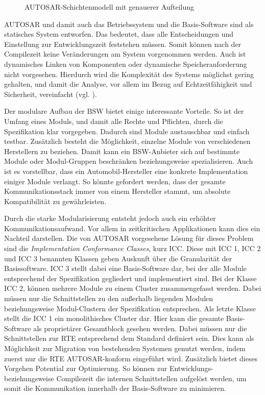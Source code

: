 \documentclass[
  a4paper,					    %
  twoside,
  DIV=calc,     				%
  bibliography=totoc,
  cleardoublepage=empty,
  ngerman,     					%
  final       					%
]{scrbook}
\begin{document}
\begin{figure}[ht]
    \centering
    \resizebox{\linewidth}{!}{}
    \caption{AUTOSAR-Schichtenmodell mit genauerer Aufteilung}
    \label{fig:autosar_refined_layer}
\end{figure}

AUTOSAR und damit auch das Betriebssystem und die Basis-Software sind als statisches System entworfen. Das bedeutet, dass alle Entscheidungen und Einstellung zur Entwicklungszeit feststehen müssen. Somit können nach der Compilezeit keine Veränderungen am System vorgenommen werden. Auch ist dynamisches Linken von Komponenten oder dynamische Speicheranforderung nicht vorgesehen. Hierdurch wird die Komplexität des Systems möglichst gering gehalten, und damit die Analyse, vor allem im Bezug auf Echtzeitfähigkeit und Sicherheit, vereinfacht (vgl. \cite[Seite 186]{SE_Autosar}).

Der modulare Aufbau der BSW bietet einige interessante Vorteile. So ist der Umfang eines Moduls, und damit alle Rechte und Pflichten, durch die Spezifikation klar vorgegeben. Dadurch sind Module austauschbar und einfach testbar. Zusätzlich besteht die Möglichkeit, einzelne Module von verschiedenen Herstellern zu beziehen. Damit kann ein BSW-Anbieter sich auf bestimmte Module oder Modul-Gruppen  beschränken beziehungsweise spezialisieren. Auch ist es vorstellbar, dass ein Automobil-Hersteller eine konkrete Implementation einiger Module verlangt. So könnte gefordert werden, dass der gesamte Kommunikationsstack immer von einem Hersteller stammt, um absolute Kompatibilität zu gewährleisten.

Durch die starke Modularisierung entsteht jedoch auch ein erhöhter Kommunikationsaufwand. Vor allem in zeitkritischen Applikationen kann dies ein Nachteil darstellen. Die von AUTOSAR vorgesehene Lösung für dieses Problem sind die \emph{Implementation Conformance Classes}, kurz ICC. Diese mit ICC 1, ICC 2 und ICC 3 benannten Klassen geben Auskunft über die Granularität der Basissoftware. ICC 3 stellt dabei eine Basis-Software dar, bei der alle Module entsprechend der Spezifikation gegliedert und implementiert sind. Bei der Klasse ICC 2, können mehrere Module zu einem Cluster zusammengefasst werden. Dabei müssen nur die Schnittstellen zu den außerhalb liegenden Modulen beziehungsweise Modul-Clustern der Spezifikation entsprechen. Als letzte Klasse stellt die ICC 1 ein monolithisches Cluster dar. Hier kann die gesamte Basis-Software als proprietärer Gesamtblock gesehen werden. Dabei müssen nur die Schnittstellen zur RTE entsprechend dem Standard definiert sein. Dies kann als Möglichkeit zur Migration von bestehenden Systemen genutzt werden, indem zuerst nur die RTE AUTOSAR-konform eingeführt wird. Zusätzlich bietet dieses Vorgehen Potential zur Optimierung. So können zur Entwicklungs- beziehungsweise Compilezeit die internen Schnittstellen aufgelöst werden, um somit die Kommunikation innerhalb der Basis-Software zu minimieren.
\end{document}

